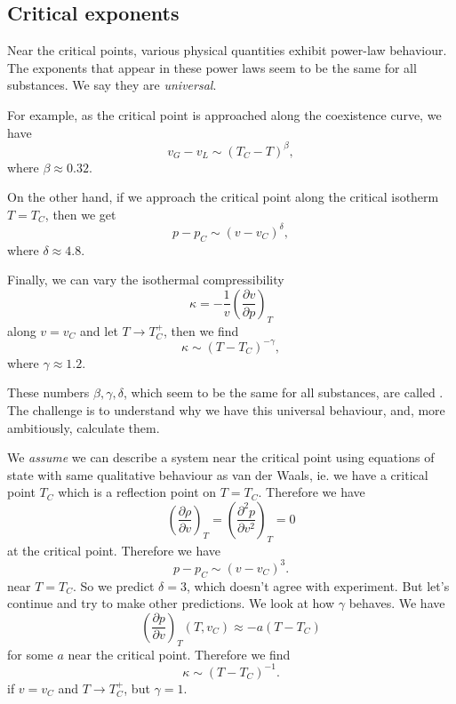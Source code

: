\documentclass[a4paper]{article}
\begin{document}

\subsection{Critical exponents}
Near the critical points, various physical quantities exhibit power-law behaviour. The exponents that appear in these power laws seem to be the same for all substances. We say they are \emph{universal}.

For example, as the critical point is approached along the coexistence curve, we have
\[
  v_G - v_L \sim (T_C - T)^\beta,
\]
where $\beta \approx 0.32$.

On the other hand, if we approach the critical point along the critical isotherm $T = T_C$, then we get
\[
  p - p_C \sim (v - v_C)^\delta,
\]
where $\delta \approx 4.8$.

Finally, we can vary the isothermal compressibility
\[
  \kappa = - \frac{1}{v} \left(\frac{\partial v}{\partial p}\right)_T
\]
along $v = v_C$ and let $T \to T_C^+$, then we find
\[
  \kappa \sim (T - T_C)^{-\gamma},
\]
where $\gamma \approx 1.2$.

These numbers $\beta, \gamma, \delta$, which seem to be the same for all substances, are called . The challenge is to understand why we have this universal behaviour, and, more ambitiously, calculate them.

We \emph{assume} we can describe a system near the critical point using equations of state with same qualitative behaviour as van der Waals, ie. we have a critical point $T_C$ which is a reflection point on $T = T_C$. Therefore we have %
\[
  \left(\frac{\partial \rho}{\partial v}\right)_T = \left(\frac{\partial^2 p}{\partial v^2}\right)_T = 0
\]
at the critical point. Therefore we have
\[
  p - p_C \sim (v - v_C)^3.
\]
near $T = T_C$. So we predict $\delta = 3$, which doesn't agree with experiment. But let's continue and try to make other predictions. We look at how $\gamma$ behaves. We have
\[
  \left(\frac{\partial p}{\partial v}\right)_T (T, v_C) \approx - a(T - T_C)
\]
for some $a$ near the critical point. Therefore we find
\[
  \kappa \sim (T - T_C)^{-1}.
\]
if $v = v_C$ and $T \to T_C^+$, but $\gamma = 1$.
\end{document}
